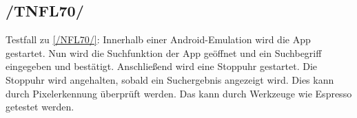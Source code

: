 \subsection*{/TNFL70/}

\label{/TNFL70/} Testfall zu \ref{/NFL70/}: Innerhalb einer \Gls{Android}-\Gls{Emulation} wird die App gestartet.
Nun wird die Suchfunktion der App geöffnet und ein Suchbegriff eingegeben und bestätigt.
Anschließend wird eine Stoppuhr gestartet.
Die Stoppuhr wird angehalten, sobald ein Suchergebnis angezeigt wird.
Dies kann durch Pixelerkennung überprüft werden.
Das kann durch Werkzeuge wie \Gls{Espresso} getestet werden.